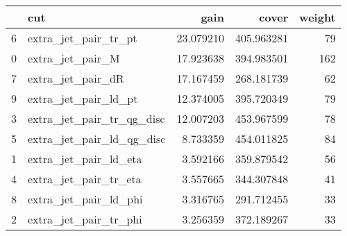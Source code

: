\begin{tabular}{llrrr}
\toprule
{} &                        cut &       gain &       cover &  weight \\
\midrule
6 &       extra\_jet\_pair\_tr\_pt &  23.079210 &  405.963281 &      79 \\
0 &           extra\_jet\_pair\_M &  17.923638 &  394.983501 &     162 \\
7 &          extra\_jet\_pair\_dR &  17.167459 &  268.181739 &      62 \\
9 &       extra\_jet\_pair\_ld\_pt &  12.374005 &  395.720349 &      79 \\
3 &  extra\_jet\_pair\_tr\_qg\_disc &  12.007203 &  453.967599 &      78 \\
5 &  extra\_jet\_pair\_ld\_qg\_disc &   8.733359 &  454.011825 &      84 \\
1 &      extra\_jet\_pair\_ld\_eta &   3.592166 &  359.879542 &      56 \\
4 &      extra\_jet\_pair\_tr\_eta &   3.557665 &  344.307848 &      41 \\
8 &      extra\_jet\_pair\_ld\_phi &   3.316765 &  291.712455 &      33 \\
2 &      extra\_jet\_pair\_tr\_phi &   3.256359 &  372.189267 &      33 \\
\bottomrule
\end{tabular}
